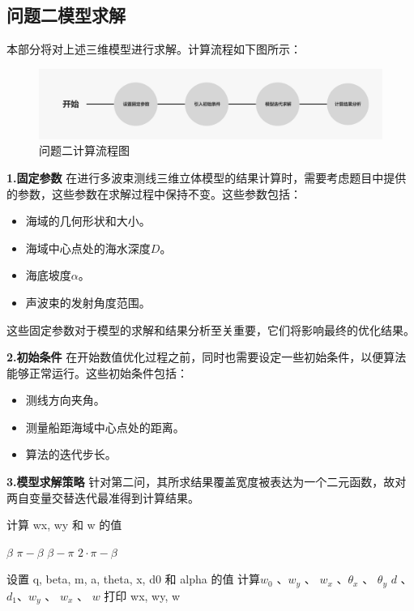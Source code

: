 \documentclass[withoutpreface,bwprint]{cumcmthesis} %
\begin{document}
    \subsection{问题二模型求解}
    本部分将对上述三维模型进行求解。计算流程如下图所示：
    \begin{figure}[htbp]
        \centering
        \includegraphics[height=0.1\textheight]{开始.png}
        \caption{问题二计算流程图}
        \label{14}
    \end{figure}
    
    \textbf{1.固定参数}
    在进行多波束测线三维立体模型的结果计算时，需要考虑题目中提供的参数，这些参数在求解过程中保持不变。这些参数包括：
    \begin{itemize}
        \item 海域的几何形状和大小。
        \item 海域中心点处的海水深度$D$。
        \item 海底坡度$\alpha$。
        \item 声波束的发射角度范围。
    \end{itemize}
    这些固定参数对于模型的求解和结果分析至关重要，它们将影响最终的优化结果。
    
    \textbf{2.初始条件}
    在开始数值优化过程之前，同时也需要设定一些初始条件，以便算法能够正常运行。这些初始条件包括：
    \begin{itemize}
        \item 测线方向夹角。
        \item 测量船距海域中心点处的距离。
        \item 算法的迭代步长。
    \end{itemize}
    
    \textbf{3.模型求解策略}
    针对第二问，其所求结果覆盖宽度被表达为一个二元函数，故对两自变量交替迭代最准得到计算结果。
    \begin{algorithm}
        \caption{计算 wx, wy 和 w 的值}
        \begin{algorithmic}[1]
                \State \Return $\beta$
            \ElsIf{$0.5 \cdot \pi < \beta \leq \pi$}
                \State \Return $\pi - \beta$
            \ElsIf{$\pi < \beta \leq 1.5 \cdot \pi$}
                \State \Return $\beta - \pi$
            \ElsIf{$1.5 \cdot \pi < \beta \leq 2 \cdot \pi$}
                \State \Return $2 \cdot \pi - \beta$
            \EndIf
        \EndProcedure
        
        \State 设置 q, beta, m, a, theta, x, d0 和 alpha 的值
        \State 计算$w_0$ 、$w_y$ 、 $w_x$ 、$\theta_x$ 、 $\theta_y$ $d$ 、 $d_1$、$w_y$ 、 $w_x$ 、 $w$
        \State 打印 wx, wy, w
        \end{algorithmic}
    \end{algorithm}
        
\end{document}
